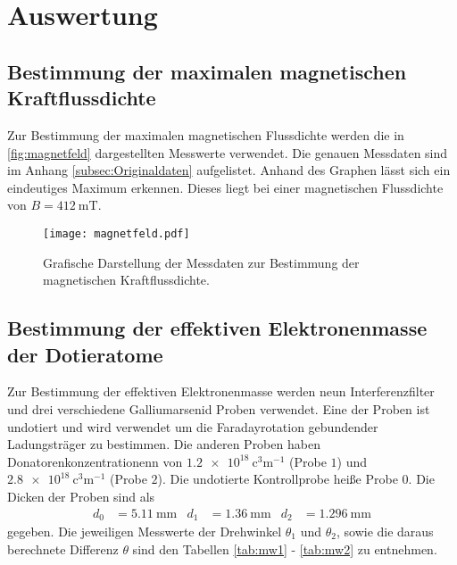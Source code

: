 \section{Auswertung}
\label{sec:Auswertung}

\subsection{Bestimmung der maximalen magnetischen Kraftflussdichte}
Zur Bestimmung der maximalen magnetischen Flussdichte werden die in \autoref{fig:magnetfeld} dargestellten Messwerte verwendet. Die genauen Messdaten sind im Anhang
\ref{subsec:Originaldaten} aufgelistet. Anhand des Graphen lässt sich ein eindeutiges Maximum erkennen. Dieses liegt bei einer magnetischen Flussdichte von 
$B = \qty{412}{\milli\tesla}$.

\begin{figure}
  \centering
  \texttt{[image: magnetfeld.pdf]}
  \caption{Grafische Darstellung der Messdaten zur Bestimmung der magnetischen Kraftflussdichte.}
  \label{fig:magnetfeld}
\end{figure}

\subsection{Bestimmung der effektiven Elektronenmasse der Dotieratome}
\label{subsec:Elektronenmasse}
Zur Bestimmung der effektiven Elektronenmasse werden neun Interferenzfilter und drei verschiedene Galliumarsenid Proben verwendet. Eine der Proben ist undotiert und wird verwendet 
um die Faradayrotation gebundender Ladungsträger zu bestimmen. Die anderen Proben haben Donatorenkonzentrationenn von $\qty{1.2e18}{\cubic\centi\metre^{-1}}$ (Probe $1$) und 
$\qty{2.8e18}{\cubic\centi\metre^{-1}}$ (Probe $2$). Die undotierte Kontrollprobe heiße Probe $0$.
Die Dicken der Proben sind als
\begin{align*}
  d_0 &= \qty{5.11}{\milli\metre} & d_1 &= \qty{1.36}{\milli\metre} & d_2 &= \qty{1.296}{\milli\metre}
\end{align*}
gegeben. Die jeweiligen Messwerte der Drehwinkel $\theta_1$ und $\theta_2$, sowie die daraus berechnete Differenz $\theta$ sind den Tabellen 
\ref{tab:mw1} - \ref{tab:mw2} zu entnehmen.

